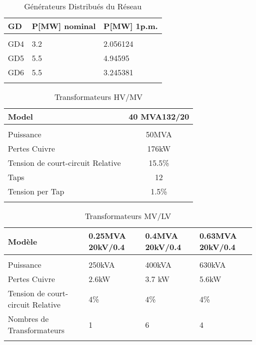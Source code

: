 \hspace{-1.7cm}
\begin{minipage}{.5\textwidth}
\begin{table}[H]
	\captionsetup{justification=centering,margin=1cm}
	\caption{Générateurs Distribués du Réseau }
	\label{tab:generateurs_du_reseaux}
	\centering
	\begin{tabular}{m{1cm}m{1.5cm}m{1.5cm}}
		\hline
		GD&P[MW] nominal&P[MW] 1p.m.\\
		\hline\\
		GD4&3.2&2.056124\\
		GD5&5.5&4.94595\\
		GD6&5.5&3.245381\\
		\hline\\
	\end{tabular}
\end{table}	
\end{minipage}
\begin{minipage}{.5\textwidth}
\begin{table}[H]
	\captionsetup{justification=centering}
	\caption{Transformateurs HV/MV }
	\label{tab:Transformateurs_HV/MV}
	\centering
	\begin{tabular}{lc}
		\hline
		Model&40 MVA132/20\\
		\hline\\
		Puissance&50MVA\\
		Pertes Cuivre&176kW\\
		Tension de court-circuit Relative&15.5\%\\
		Taps&12\\
		Tension per Tap&1.5\%\\
		\hline\\
	\end{tabular}
\end{table}	
\end{minipage}
\begin{table}[H]
	\captionsetup{justification=centering,margin=2cm}
	\caption{Transformateurs MV/LV }
	\label{tab:Transformateurs_MV/LV}
	\centering
	\begin{tabular}{lm{2cm}m{2cm}m{2cm}}
		\hline
		Modèle&0.25MVA 20kV/0.4&0.4MVA 20kV/0.4&0.63MVA 20kV/0.4\\
		\hline\\
		Puissance&250kVA&400kVA&630kVA\\
		Pertes Cuivre&2.6kW&3.7 kW&5.6kW\\
		Tension de court-circuit Relative&4\%&4\%&4\%\\
		Nombres de Transformateurs&1&6&4\\
		\hline\\
	\end{tabular}
\end{table}	
